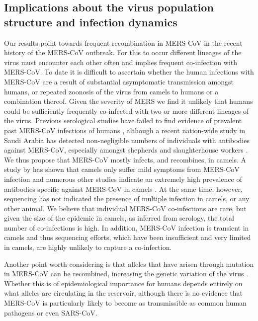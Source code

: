 \documentclass[11pt,oneside,letterpaper]{article}
\begin{document}
\subsection*{Implications about the virus population structure and infection dynamics}
Our results point towards frequent recombination in MERS-CoV in the recent history of the MERS-CoV outbreak.
For this to occur different lineages of the virus must encounter each other often and implies frequent co-infection with MERS-CoV.
To date it is difficult to ascertain whether the human infections with MERS-CoV are a result of substantial asymptomatic transmission amongst humans, or repeated zoonosis of the virus from camels to humans or a combination thereof.
Given the severity of MERS we find it unlikely that humans could be sufficiently frequently co-infected with two or more different lineages of the virus.
Previous serological studies have failed to find evidence of prevalent past MERS-CoV infections of humans \citep{gierer_2013,aburizaiza_2013}, although a recent nation-wide study in Saudi Arabia has detected non-negligible numbers of individuals with antibodies against MERS-CoV, especially amongst shepherds and slaughterhouse workers \citep{muller_2015}.
We thus propose that MERS-CoV mostly infects, and recombines, in camels.
A study by \cite{adney_2014} has shown that camels only suffer mild symptoms from MERS-CoV infection and numerous other studies indicate an extremely high prevalence of antibodies specific against MERS-CoV in camels \citep{muller_2014,corman_antibodies_2014,chu_2014,reusken_2013,reusken_2014}.
At the same time, however, sequencing has not indicated the presence of multiple infection in camels, or any other animal.
We believe that individual MERS-CoV co-infections are rare, but given the size of the epidemic in camels, as inferred from serology, the total number of co-infections is high.
In addition, MERS-CoV infection is transient in camels \cite{adney_2014} and thus sequencing efforts, which have been insufficient and very limited in camels, are highly unlikely to capture a co-infection.

Another point worth considering is that alleles that have arisen through mutation in MERS-CoV can be recombined, increasing the genetic variation of the virus \citep{muller_1932}.
Whether this is of epidemiological importance for humans depends entirely on what alleles are circulating in the reservoir, although there is no evidence that MERS-CoV is particularly likely to become as transmissible as common human pathogens or even SARS-CoV.
\end{document}
